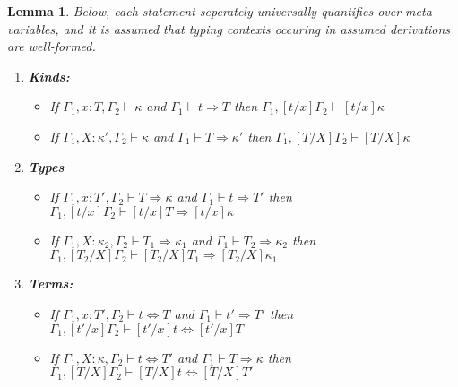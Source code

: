 \documentclass{article}
\newcommand{\tpsynth}[0]{\Rightarrow}
\newtheorem{lemma}[theorem]{Lemma}
\begin{document}
\begin{lemma}
  \label{lem:subst-class}
  Below, each statement seperately universally quantifies over meta-variables,
  and it is assumed that typing contexts occuring in assumed derivations are
  well-formed.
  \begin{enumerate}
  \item \textbf{Kinds:}
    \begin{itemize}
    \item If \(\Gamma_1,x:T,\Gamma_2 \vdash \kappa\) and \(\Gamma_1 \vdash t
      \tpsynth T\) then \(\Gamma_1,[t/x]\Gamma_2 \vdash [t/x] \kappa\)
      
    \item If \(\Gamma_1,X:\kappa',\Gamma_2 \vdash \kappa\) and \(\Gamma_1 \vdash
      T \tpsynth \kappa'\) then \(\Gamma_1,[T/X]\Gamma_2 \vdash [T/X]\kappa\)
    \end{itemize}
    
  \item \textbf{Types}
    \begin{itemize}
    \item If \(\Gamma_1,x:T',\Gamma_2 \vdash T \tpsynth \kappa\) and \(\Gamma_1 \vdash t
      \tpsynth T'\) then \(\Gamma_1,[t/x]\Gamma_2 \vdash [t/x]T \tpsynth [t/x]\kappa\)
      
    \item If \(\Gamma_1,X:\kappa_2,\Gamma_2 \vdash T_1 \tpsynth \kappa_1\) and \(\Gamma_1
      \vdash T_2 \tpsynth \kappa_2\) then \(\Gamma_1,[T_2/X]\Gamma_2 \vdash [T_2/X]T_1 \tpsynth [T_2/X]\kappa_1\)
    \end{itemize}
    
  \item \textbf{Terms:}
    \begin{itemize}
    \item If \(\Gamma_1,x:T',\Gamma_2 \vdash t \Leftrightarrow T\) and
      \(\Gamma_1 \vdash t' \tpsynth T'\) then \(\Gamma_1,[t'/x]\Gamma_2 \vdash [t'/x]t
      \Leftrightarrow [t'/x]T\)
     
    \item If \(\Gamma_1,X:\kappa,\Gamma_2 \vdash t \Leftrightarrow T'\) and
      \(\Gamma_1 \vdash T \tpsynth \kappa\) then \(\Gamma_1,[T/X]\Gamma_2 \vdash
      [T/X]t \Leftrightarrow [T/X]T'\)
    \end{itemize}
  \end{enumerate}
\end{lemma}
\end{document}
